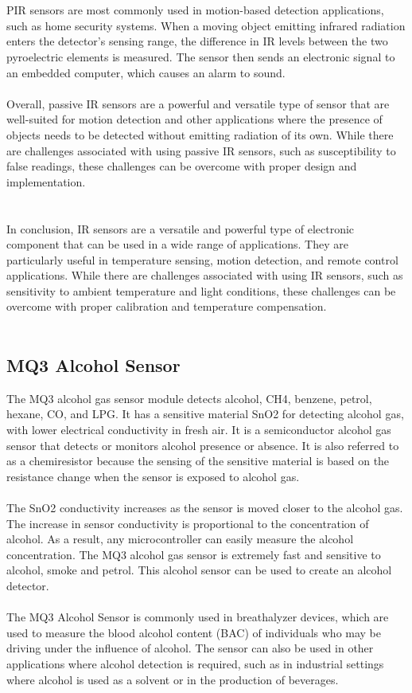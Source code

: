 \documentclass[12pt]{article}
\begin{document}
\\
\\
PIR sensors are most commonly used in motion-based detection applications, such as home security systems. When a moving object emitting infrared radiation enters the detector's sensing range, the difference in IR levels between the two pyroelectric elements is measured. The sensor then sends an electronic signal to an embedded computer, which causes an alarm to sound.
\\
\\
Overall, passive IR sensors are a powerful and versatile type of sensor that are well-suited for motion detection and other applications where the presence of objects needs to be detected without emitting radiation of its own. While there are challenges associated with using passive IR sensors, such as susceptibility to false readings, these challenges can be overcome with proper design and implementation.
\\
\\
\\
In conclusion, IR sensors are a versatile and powerful type of electronic component that can be used in a wide range of applications. They are particularly useful in temperature sensing, motion detection, and remote control applications. While there are challenges associated with using IR sensors, such as sensitivity to ambient temperature and light conditions, these challenges can be overcome with proper calibration and temperature compensation.
\\
\\
\subsection{MQ3 Alcohol Sensor}
The MQ3 alcohol gas sensor module detects alcohol, CH4, benzene, petrol, hexane, CO, and LPG. It has a sensitive material SnO2 for detecting alcohol gas, with lower electrical conductivity in fresh air. It is a semiconductor alcohol gas sensor that detects or monitors alcohol presence or absence. It is also referred to as a chemiresistor because the sensing of the sensitive material is based on the resistance change when the sensor is exposed to alcohol gas.
\\
\\
The SnO2 conductivity increases as the sensor is moved closer to the alcohol gas. The increase in sensor conductivity is proportional to the concentration of alcohol. As a result, any microcontroller can easily measure the alcohol concentration. The MQ3 alcohol gas sensor is extremely fast and sensitive to alcohol, smoke and petrol. This alcohol sensor can be used to create an alcohol detector.
\\
\\
The MQ3 Alcohol Sensor is commonly used in breathalyzer devices, which are used to measure the blood alcohol content (BAC) of individuals who may be driving under the influence of alcohol. The sensor can also be used in other applications where alcohol detection is required, such as in industrial settings where alcohol is used as a solvent or in the production of beverages.
\\
\\
\end{document}
